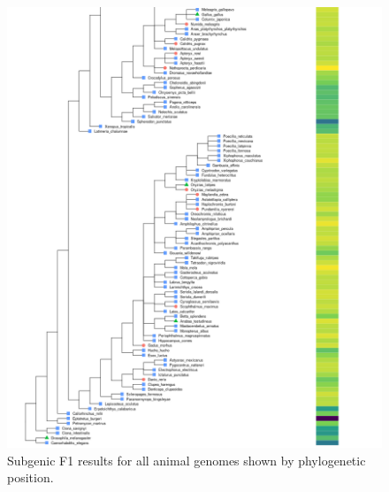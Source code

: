 \documentclass{article}
\renewcommand{\thefigure}{S\arabic{figure}}
\begin{document}
\begin{figure}[!h]
\centerline{\includegraphics[width=\textwidth]{images/animals_f1_scores_part2}}
\caption{Subgenic F1 results for all animal genomes shown by phylogenetic position.}
\end{figure}
\end{document}
